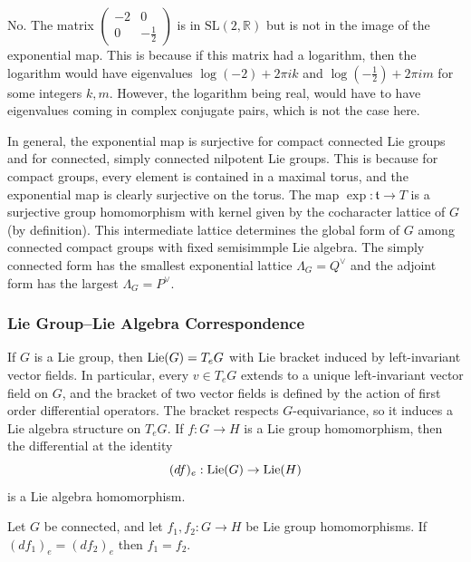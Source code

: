 \documentclass[12pt]{article}
\begin{document}
\begin{solution}
    No. The matrix $\begin{pmatrix} -2 & 0 \\ 0 & -\frac{1}{2} \end{pmatrix}$ is in $\mathrm{SL}(2, \mathbb{R})$ but is not in the image of the exponential map. This is because if this matrix had a logarithm, then the logarithm would have eigenvalues $\log(-2) + 2\pi i k$ and $\log(-\frac{1}{2}) + 2\pi i m$ for some integers $k,m$. However, the logarithm being real, would have to have eigenvalues coming in complex conjugate pairs, which is not the case here.
\end{solution}
In general, the exponential map is surjective for compact connected Lie groups and for connected, simply connected nilpotent Lie groups. This is because for compact groups, every element is contained in a maximal torus, and the exponential map is clearly surjective on the torus. The map $\exp: \mathfrak{t} \to T$ is a surjective group homomorphism with kernel given by the cocharacter lattice of $G$ (by definition). This intermediate lattice determines the global form of $G$ among connected compact groups with fixed semisimmple Lie algebra. The simply connected form has the smallest exponential lattice $\Lambda_G = Q^\vee$ and the adjoint form has the largest $\Lambda_G = P^\vee$.


\subsubsection{Lie Group--Lie Algebra Correspondence}

\begin{proposition}
    If \(G\) is a Lie group, then $\operatorname{Lie}(G)=T_eG$ with Lie bracket induced by left-invariant vector fields. In particular, every $v\in T_eG$ extends to a unique left-invariant vector field on $G$, and the bracket of two vector fields is defined by the action of first order differential operators. The bracket respects $G$-equivariance, so it induces a Lie algebra structure on $T_eG$. If \(f:G\to H\) is a Lie group homomorphism, then the differential at the identity
    \[
        (df)_e:\operatorname{Lie}(G)\to\operatorname{Lie}(H)
    \]
    is a Lie algebra homomorphism.
\end{proposition}

\begin{proposition}
    Let \(G\) be connected, and let \(f_1,f_2:G\to H\) be Lie group homomorphisms.
    If $(df_1)_e=(df_2)_e$ then \(f_1=f_2\).
\end{proposition}
\end{document}
